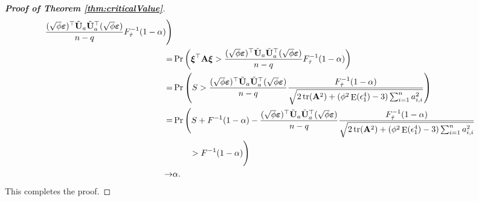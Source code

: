 \documentclass[11pt]{article}
\DeclareMathOperator{\mytr}{tr}
\DeclareMathOperator{\myE}{E}
\newcommand{\BA}{\mathbf{A}}    \newcommand{\BB}{\mathbf{B}}    \newcommand{\BC}{\mathbf{C}}    \newcommand{\BD}{\mathbf{D}}    \newcommand{\BE}{\mathbf{E}}    \newcommand{\BF}{\mathbf{F}}    \newcommand{\BG}{\mathbf{G}}    \newcommand{\BH}{\mathbf{H}}    \newcommand{\BI}{\mathbf{I}}    \newcommand{\BJ}{\mathbf{J}}    \newcommand{\BK}{\mathbf{K}}    \newcommand{\BL}{\mathbf{L}}
\newcommand{\bfsym}[1]{\ensuremath{\boldsymbol{#1}}}
\def\bxi{\bfsym {\xi}}
\theoremstyle{plain}
\theoremstyle{definition}
\theoremstyle{remark}
\begin{document}
\begin{proof}[\textbf{Proof of Theorem \ref{thm:criticalValue}}]
\begin{align*}
            \frac{
            (\sqrt \phi \bepsilon)^\top \tilde \BU_a  \tilde \BU_a^\top (\sqrt \phi \bepsilon)
}{n-q} F^{-1}_{\hat \tau} (1-\alpha)
\Bigg)
            \\
            =&
            \Pr \left( \bxi^\top \BA \bxi  
                >
                \frac{
            (\sqrt \phi \bepsilon)^\top \tilde \BU_a  \tilde \BU_a^\top (\sqrt \phi \bepsilon)
}{n-q}
                F^{-1}_{\hat \tau} (1-\alpha)
            \right)
            \\
            =&
            \Pr \left( S> 
\frac{
            (\sqrt \phi \bepsilon)^\top \tilde \BU_a  \tilde \BU_a^\top (\sqrt \phi \bepsilon)
}{n-q}
            \frac{F^{-1}_{\hat \tau} (1-\alpha)}{
            \sqrt{
    2 \mytr(\BA^2)
    +
    ( \phi^2 \myE (\epsilon_1^4)-3) \sum_{i=1}^n a_{i,i}^2
            }             
    }
             \right) 
             \\
            =& 
            \Pr \Bigg( S+F^{-1}(1-\alpha)-
\frac{
            (\sqrt \phi \bepsilon)^\top \tilde \BU_a  \tilde \BU_a^\top (\sqrt \phi \bepsilon)
}{n-q}
            \frac{F^{-1}_{\hat \tau} (1-\alpha)}{
            \sqrt{
    2 \mytr(\BA^2)
    +
    ( \phi^2 \myE (\epsilon_1^4)-3) \sum_{i=1}^n a_{i,i}^2
            }             
    }
    \\
    &\quad \quad>F^{-1}(1-\alpha)
             \Bigg) 
             \\
             \to&  \alpha
             .
\end{align*}
This completes the proof.

\end{proof}











\end{document}
